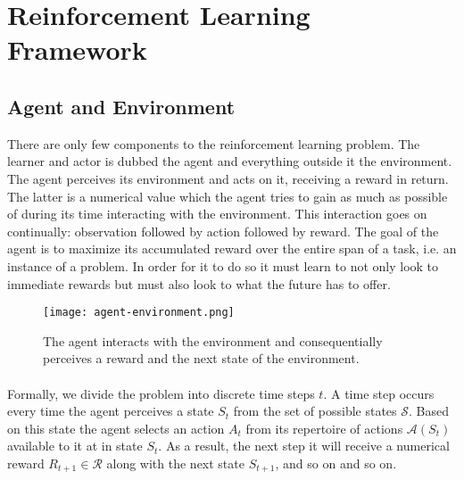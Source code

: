 



\section{Reinforcement Learning Framework}
\subsection{Agent and Environment}
There are only few components to the reinforcement learning problem.
The learner and actor is dubbed the agent and everything outside it the environment.
The agent perceives its environment and acts on it,
receiving a reward in return.
The latter is a numerical value
which the agent tries to gain as much as possible of
during its time interacting with the environment.
This interaction goes on continually:
observation followed by action followed by reward.
The goal of the agent is to maximize its accumulated reward
over the entire span of a task,
i.e. an instance of a problem.
In order for it to do so
it must learn to not only look to immediate rewards
but must also look to what the future has to offer.

\begin{figure}[ht]
	\center
	\texttt{[image: agent-environment.png]}
  \caption[Reinforcement learning framework]{
    The agent interacts with the environment and
    consequentially perceives a reward and the next state of the environment.
  \parencite{Sutton1998a}
  }
	\label{agent-env}
\end{figure}

\paragraph{}
Formally, we divide the problem into discrete time steps $t$.
A time step occurs every time the agent perceives a state $S_t$
from the set of possible states $\mathcal{S}$.
Based on this state the agent selects an action $A_t$
from its repertoire of actions $\mathcal{A}(S_t)$
available to it at in state $S_t$.
As a result, the next step it will receive
a numerical reward $R_{t+1} \in \mathcal{R}$
along with the next state $S_{t+1}$,
and so on and so on.

